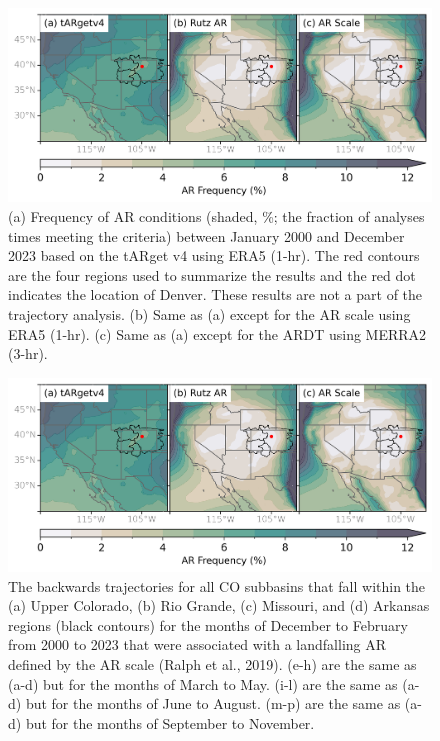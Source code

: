 \documentclass[jgrga]{agutexSI2019}
\begin{document}
\begin{article}
\begin{figure}
\noindent\includegraphics[width=\textwidth]{figS1.png}
\caption{(a) Frequency of AR conditions (shaded, \%; the fraction of analyses times meeting the criteria) between January 2000 and December 2023 based on the  tARget v4 using ERA5 (1-hr). The red contours are the four regions used to summarize the results and the red dot indicates the location of Denver. These results are not a part of the trajectory analysis. (b) Same as (a) except for the AR scale \cite{MartinRalph2019} using ERA5 (1-hr). (c) Same as (a) except for the  ARDT using MERRA2 (3-hr).}
\label{fig:ar_overhead}
\end{figure}
\newpage

\begin{figure}
\noindent\includegraphics[width=\textwidth]{figS1.png}
\caption{The backwards trajectories for all CO subbasins that fall within the (a) Upper Colorado, (b) Rio Grande, (c) Missouri, and (d) Arkansas regions (black contours) for the months of December to February from 2000 to 2023  that were associated with a landfalling AR defined by the AR scale (Ralph et al., 2019). (e-h) are the same as (a-d) but for the months of March to May. (i-l) are the same as (a-d) but for the months of June to August. (m-p) are the same as (a-d) but for the months of September to November.}
\label{fig:supp:spaghetti_ssn}
\end{figure}
\clearpage


\end{article}
\end{document}

